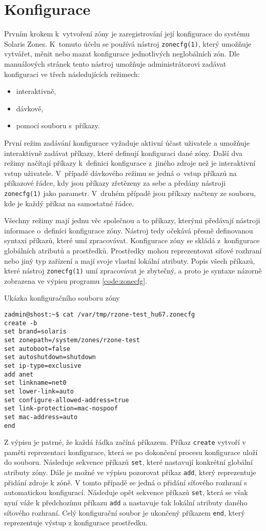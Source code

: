 \section{Konfigurace}
\label{chapter:zones:configuration}
Prvním krokem k~vytvoření zóny je zaregistrování její konfigurace do systému Solaris Zones. K~tomuto účelu se používá nástroj
\verb|zonecfg(1)|, který umožňuje vytvářet, měnit nebo mazat konfigurace jednotlivých neglobálních zón. Dle manuálových stránek 
\cite{oracle:manpages:zonecfg} tento nástroj umožňuje administrátorovi zadávat konfiguraci ve třech následujících režimech:
\begin{itemize}
 \item interaktivně,
 \item dávkově,
 \item pomocí souboru s~příkazy.
\end{itemize}
První režim zadávání konfigurace vyžaduje aktivní účast uživatele a umožňuje interaktivně zadávat příkazy, které definují
konfiguraci dané zóny. Další dva režimy načítají příkazy k~definici konfigurace z~jiného zdroje než je interaktivní vstup uživatele.
V~případě dávkového režimu se jedná o~vstup příkazů na příkazové řádce, kdy jsou příkazy zřetězeny za sebe a předány nástroji
\verb|zonecfg(1)| jako parametr. V~druhém případě jsou příkazy načteny ze souboru, kde je každý příkaz na samostatné řádce.

Všechny režimy mají jednu věc společnou a to příkazy, kterými předávají nástroji informace o~definici konfigurace zóny.
Nástroj tedy očekává přesně definovanou syntaxi příkazů, které umí zpracovávat. Konfigurace zóny se skládá z~konfigurace 
globálních atributů a prostředků. Prostředky mohou reprezentovat síťové rozhraní nebo jiný typ zařízení a mají svoje vlastní
lokální atributy. Popis všech příkazů, které nástroj \verb|zonecfg(1)| umí zpracovávat je zbytečný, a proto je syntaxe
názorně zobrazena ve výpisu programu \ref{code:zonecfg}.
\begin{listing}[ht]
  \caption{Ukázka konfiguračního souboru zóny}
  \label{code:zonecfg}
  \begin{verbatim}
zadmin@shost:~$ cat /var/tmp/rzone-test_hu67.zonecfg
create -b
set brand=solaris
set zonepath=/system/zones/rzone-test
set autoboot=false
set autoshutdown=shutdown
set ip-type=exclusive
add anet
set linkname=net0
set lower-link=auto
set configure-allowed-address=true
set link-protection=mac-nospoof
set mac-address=auto
end
  \end{verbatim}
\end{listing}
Z výpisu je patrné, že každá řádka začíná příkazem. Příkaz \verb|create| vytvoří v paměti reprezentaci
konfigurace, která se po dokončení procesu konfigurace uloží do souboru. Následuje sekvence příkazů \verb|set|, které nastavují
konkrétní globální atributy zóny. Dále je možné ve výpisu pozorovat příkaz \verb|add|, který reprezentuje přidání zdroje k zóně.
V tomto případě se jedná o přidání síťového rozhraní s automatickou konfigurací. Následuje opět sekvence příkazů \verb|set|, která
se však nyní váže k předchozímu příkazu \verb|add| a nastavuje tak lokální atributy daného síťového rozhraní. Celý konfigurační
soubor je ukončený příkazem \verb|end|, který reprezentuje výstup z konfigurace prostředku.

